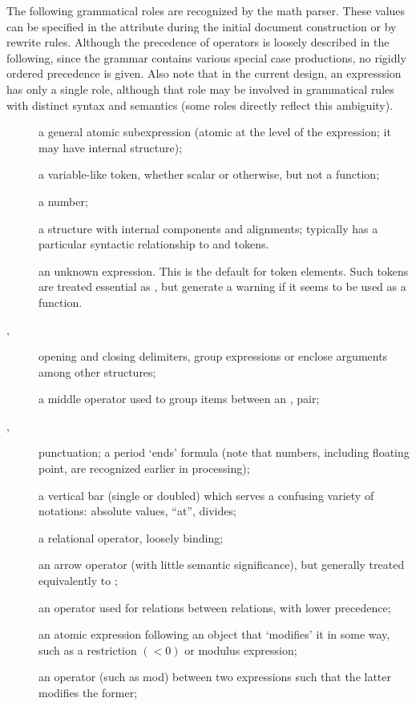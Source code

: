 \documentclass{book}
\begin{document}
The following grammatical roles are recognized by the math parser.
These values can be specified in the  attribute during the initial 
document construction or by rewrite rules.  Although the precedence of operators
is loosely described in the following, since the grammar contains various special
case productions, no rigidly ordered precedence is given.
Also note that in the current design, an expresssion has only a single role,
although that role may be involved in grammatical rules with distinct syntax and semantics
(some roles directly reflect this ambiguity).
\begin{description}
\item[] a general atomic subexpression
  (atomic at the level of the expression; it may have internal structure);
\item[] a variable-like token, whether scalar or otherwise,
  but not a function;
\item[] a number;
\item[] a structure with internal components and alignments;
  typically has a particular syntactic relationship to  and  tokens.
\item[] an unknown expression. This is the default for token elements.
  Such tokens are treated essential as , but generate a warning if it
  seems to be used as a function.

\item[,] opening and closing delimiters, group expressions
  or enclose arguments among other structures;
\item[] a middle operator used to group items between an ,
   pair;
\item[,] punctuation; a period `ends' formula
  (note that numbers, including floating point, are recognized earlier in processing);
\item[] a vertical bar (single or doubled) which serves a confusing variety
  of notations: absolute values, ``at'', divides;

\item[] a relational operator, loosely binding;
\item[] an arrow operator (with little semantic significance),
  but generally treated equivalently to ;
\item[] an operator used for relations between relations, with lower precedence;
\item[] an atomic expression following an object that `modifies' it in some way,
  such as a restriction $(<0)$ or modulus expression;
\item[] an operator (such as mod) between two expressions such that
  the latter modifies  the former;


\end{description}
\end{document}
